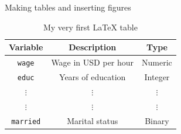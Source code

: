 \documentclass[10pt]{beamer}
\begin{document}
\begin{frame}[fragile]{Making tables and inserting figures}
    \begin{table}[H]
        \centering
        \caption{My very first \LaTeX \: table}
        \label{tab:my_label}
        \begin{tabular}{c|c|c}
            Variable & Description & Type  \\ \hline
            \texttt{wage} & Wage in USD per hour & Numeric  \\
            \texttt{educ} & Years of education & Integer \\
            $\vdots$ & $\vdots$ & $\vdots$ \\
            $\vdots$ & $\vdots$ & $\vdots$ \\
            \texttt{married} & Marital status & Binary\\
            \hline \hline 
        \end{tabular}
    \end{table}
\end{frame}
\end{document}
